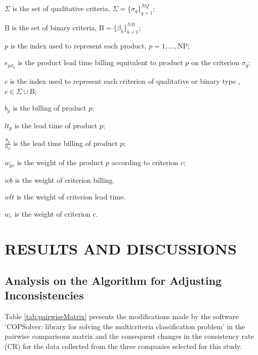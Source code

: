 \documentclass[10pt,fleqn,a4paper,twoside]{article}
\begin{document}
$\Sigma$ is the set of qualitative criteria, \quad $\Sigma = \{\sigma_q\}_{q=1}^{NQ}$;

$\textrm{B}$ is the set of binary criteria, \quad $\textrm{B} = \{\beta_b\}_{b=1}^{NB}$;

$p$ is the index used to represent each product, \quad $p= 1,...,\textrm{NP}$;

$e_{p\sigma_q}$ is the product lead time billing equivalent to product $p$ on the criterion $\sigma_q$;

$c$ is the index used to represent each criterion of qualitative or binary type , \quad $c \in \Sigma \cup \textrm{B}$;
 
$b_p$ is the billing of product $p$;

$lt_p$ is the lead time of product $p$;

$\frac{b_p}{lt_p}$ is the lead time billing of product $p$;

$w_{pc}$ is the weight of the product $p$ according to criterion $c$;

$wb$ is the weight of criterion billing.

$wlt$ is the weight of criterion lead time.

$w_{c}$ is the weight of criterion $c$.

    
    \section{RESULTS AND DISCUSSIONS}
    
    \subsection{Analysis on the Algorithm for Adjusting Inconsistencies}
    
    Table \ref{tab:pairwiseMatrix} presents the modifications made by the software 'COPSolver: library for solving the multicriteria classification problem' in the pairwise comparisons matrix and the consequent changes in the consistency rate (CR) for the data collected from the three companies selected for this study.
\end{document}
